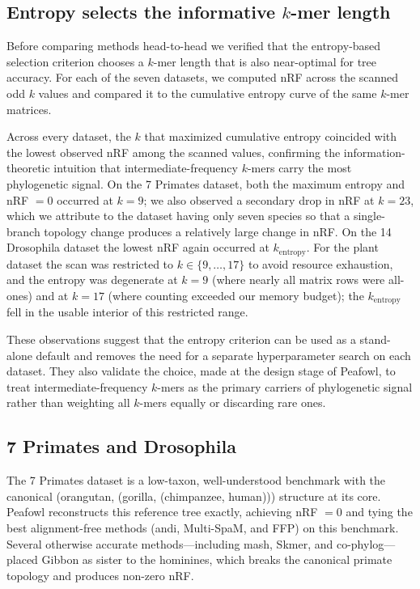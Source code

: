 \documentclass[11pt]{article}
\begin{document}
\subsection{Entropy selects the informative $k$-mer length}

Before comparing methods head-to-head we verified that the entropy-based
selection criterion chooses a $k$-mer length that is also near-optimal for
tree accuracy. For each of the seven datasets, we computed nRF across the
scanned odd $k$ values and compared it to the cumulative entropy curve of
the same $k$-mer matrices.

Across every dataset, the $k$ that maximized cumulative entropy coincided
with the lowest observed nRF among the scanned values, confirming the
information-theoretic intuition that intermediate-frequency $k$-mers carry
the most phylogenetic signal. On the 7 Primates dataset, both the maximum
entropy and nRF $= 0$ occurred at $k = 9$; we also observed a secondary
drop in nRF at $k = 23$, which we attribute to the dataset having only
seven species so that a single-branch topology change produces a relatively
large change in nRF. On the 14 Drosophila dataset the lowest nRF again
occurred at $k_\mathrm{entropy}$. For the plant dataset the scan was
restricted to $k \in \{9, \ldots, 17\}$ to avoid resource exhaustion, and
the entropy was degenerate at $k = 9$ (where nearly all matrix rows were
all-ones) and at $k = 17$ (where counting exceeded our memory budget); the
$k_\mathrm{entropy}$ fell in the usable interior of this restricted range.

These observations suggest that the entropy criterion can be used as a
stand-alone default and removes the need for a separate hyperparameter
search on each dataset. They also validate the choice, made at the design
stage of Peafowl, to treat intermediate-frequency $k$-mers as the primary
carriers of phylogenetic signal rather than weighting all $k$-mers equally
or discarding rare ones.

\subsection{7 Primates and Drosophila}

The 7 Primates dataset is a low-taxon, well-understood benchmark with the
canonical (orangutan, (gorilla, (chimpanzee, human))) structure at its core.
Peafowl reconstructs this reference tree exactly, achieving nRF $= 0$ and
tying the best alignment-free methods (andi, Multi-SpaM, and FFP) on this
benchmark. Several otherwise accurate methods---including mash, Skmer, and
co-phylog---placed Gibbon as sister to the hominines, which breaks the
canonical primate topology and produces non-zero nRF.
\end{document}
